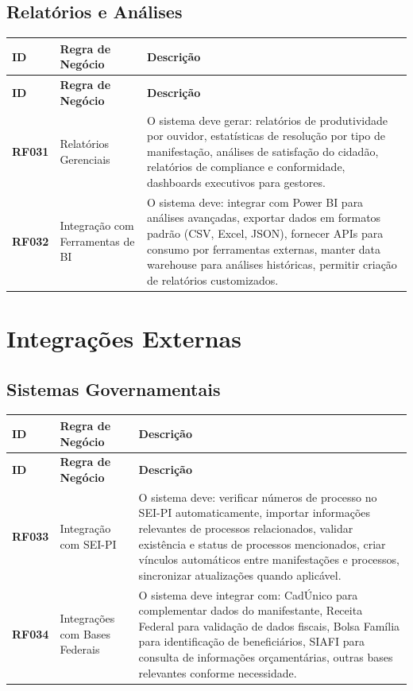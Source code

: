 \documentclass[12pt,a4paper]{article}
\newcommand{\rf}[1]{\textbf{\color{primaryblue}RF#1}}
\begin{document}
\subsection{Relatórios e Análises}

\begin{longtable}{|p{2cm}|p{5cm}|p{8cm}|}
\hline
\textbf{ID} & \textbf{Regra de Negócio} & \textbf{Descrição} \\
\hline
\endfirsthead
\hline
\textbf{ID} & \textbf{Regra de Negócio} & \textbf{Descrição} \\
\hline
\endhead

\rf{031} & Relatórios Gerenciais & O sistema deve gerar: relatórios de produtividade por ouvidor, estatísticas de resolução por tipo de manifestação, análises de satisfação do cidadão, relatórios de compliance e conformidade, dashboards executivos para gestores. \\
\hline

\rf{032} & Integração com Ferramentas de BI & O sistema deve: integrar com Power BI para análises avançadas, exportar dados em formatos padrão (CSV, Excel, JSON), fornecer APIs para consumo por ferramentas externas, manter data warehouse para análises históricas, permitir criação de relatórios customizados. \\
\hline

\end{longtable}

\section{Integrações Externas}

\subsection{Sistemas Governamentais}

\begin{longtable}{|p{2cm}|p{5cm}|p{8cm}|}
\hline
\textbf{ID} & \textbf{Regra de Negócio} & \textbf{Descrição} \\
\hline
\endfirsthead
\hline
\textbf{ID} & \textbf{Regra de Negócio} & \textbf{Descrição} \\
\hline
\endhead

\rf{033} & Integração com SEI-PI & O sistema deve: verificar números de processo no SEI-PI automaticamente, importar informações relevantes de processos relacionados, validar existência e status de processos mencionados, criar vínculos automáticos entre manifestações e processos, sincronizar atualizações quando aplicável. \\
\hline

\rf{034} & Integrações com Bases Federais & O sistema deve integrar com: CadÚnico para complementar dados do manifestante, Receita Federal para validação de dados fiscais, Bolsa Família para identificação de beneficiários, SIAFI para consulta de informações orçamentárias, outras bases relevantes conforme necessidade. \\
\hline

\end{longtable}
\end{document}
